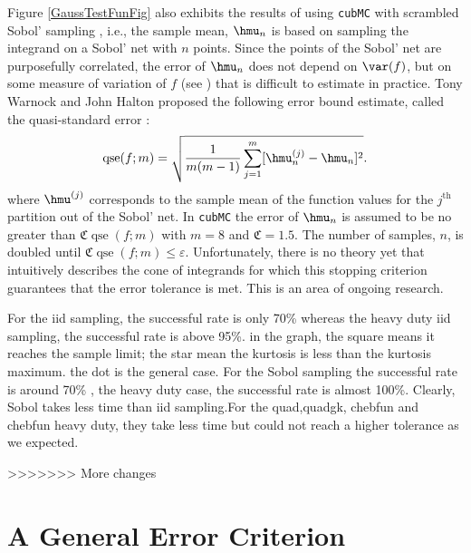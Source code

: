 \documentclass[graybox]{svmult}
\newcommand{\fudge}{\mathfrak{C}}
\DeclareMathOperator{\qse}{qse}
\newcommand{\aMC}{{\tt cubMC}\xspace}
\begin{document}
Figure \ref{GaussTestFunFig} also exhibits the results of using \aMC with scrambled Sobol' sampling \citep{Owe95,Owe96,Owe97,Mat98,HonHic00a,DicPil10a}, i.e., the sample mean,  $\hmu_n$ is based on sampling the integrand on a Sobol' net with $n$ points.  Since the points of the Sobol' net are purposefully correlated, the error of $\hmu_n$ does not depend on $\var(f)$, but on some measure of variation of $f$ (see \citep{Owe95,Owe96,Owe97,DicPil10a}) that is difficult to estimate in practice.  Tony Warnock and John Halton proposed the following error bound estimate, called the quasi-standard error \citep{Hal05a,Owe06a}:
\begin{equation} \label{qsedef}
\qse(f;m) = \sqrt{\frac{1}{m(m-1)} \sum_{j=1}^m  [\hmu^{(j)}_n - \hmu_n]^2}.
\end{equation}
where $\hmu^{(j)}$ corresponds to the sample mean of the function values for the $j^{\text{th}}$ partition out of the Sobol' net.  In \aMC the error of $\hmu_n$ is assumed to be no greater than  $\fudge \qse(f;m)$ with $m=8$ and $\fudge=1.5$.  The number of samples, $n$, is doubled until $\fudge \qse(f;m) \le \varepsilon$.  Unfortunately, there is no theory yet that intuitively describes the cone of integrands for which this stopping criterion guarantees that the error tolerance is met.  This is an area of ongoing research.

For the iid sampling, the successful rate is only 70\% whereas the heavy duty iid sampling, the successful 
rate is above 95\%. in the graph, the square means it reaches the sample limit; the star mean the kurtosis is less than the kurtosis maximum. the dot is the general case.
For the Sobol sampling the successful rate is around 70\% , the heavy duty case, the successful rate is almost 100\%. Clearly, Sobol takes less time than iid sampling.For the quad,quadgk, chebfun and chebfun heavy duty, they take less time but could not reach a higher tolerance as we expected.



>>>>>>> More changes


\section{A General Error Criterion} \label{relerrsec}
\end{document}
